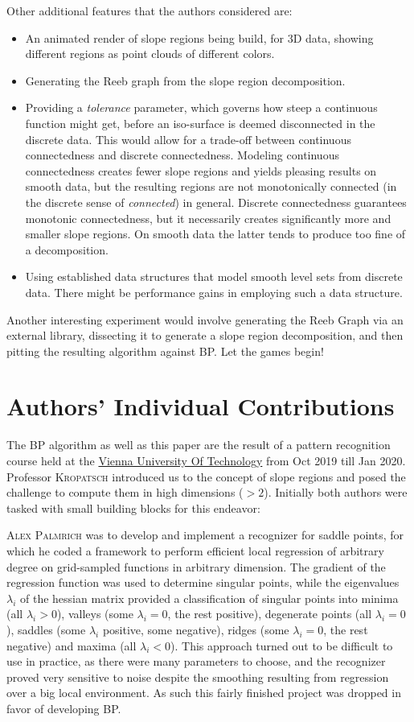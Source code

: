 \documentclass[a4paper,12pt,notitlepage,fullpage]{paper}
\theoremstyle{plain}
\theoremstyle{definition}
\begin{document}
Other additional features that the authors considered are:
\begin{itemize}
\item An animated render of slope regions being build, for 3D data, showing different regions as point clouds of different colors.
\item Generating the Reeb graph from the slope region decomposition.
\item Providing a \emph{tolerance} parameter, which governs how steep a continuous function might get, before an iso-surface is deemed disconnected in the discrete data.
This would allow for a trade-off between continuous connectedness and discrete connectedness.
Modeling continuous connectedness creates fewer slope regions and yields pleasing results on smooth data, but the resulting regions are not monotonically connected (in the discrete sense of \emph{connected}) in general.
Discrete connectedness guarantees monotonic connectedness, but it necessarily creates significantly more and smaller slope regions.
On smooth data the latter tends to produce too fine of a decomposition.
\item Using established data structures that model smooth level sets from discrete data. There might be performance gains in employing such a data structure.
\end{itemize}

Another interesting experiment would involve generating the Reeb Graph via an external library, dissecting it to generate a slope region decomposition, and then pitting the resulting algorithm against BP. Let the games begin!

\section{Authors' Individual Contributions}
The BP algorithm as well as this paper are the result of a pattern recognition course held at the \href{https://www.tuwien.at/en/}{Vienna University Of Technology} from Oct 2019 till Jan 2020. Professor \textsc{Kropatsch} introduced us to the concept of slope regions and posed the challenge to compute them in high dimensions ($>2$). Initially both authors were tasked with small building blocks for this endeavor:

\textsc{Alex Palmrich} was to develop and implement a recognizer for saddle points, for which he coded a framework to perform efficient local regression of arbitrary degree on grid-sampled functions in arbitrary dimension. The gradient of the regression function was used to determine singular points, while the eigenvalues $\lambda_i$ of the hessian matrix provided a classification of singular points into minima (all $\lambda_i>0$), valleys (some $\lambda_i=0$, the rest positive), degenerate points (all $\lambda_i=0$), saddles (some $\lambda_i$ positive, some negative), ridges (some $\lambda_i=0$, the rest negative) and maxima (all $\lambda_i<0$). This approach turned out to be difficult to use in practice, as there were many parameters to choose, and the recognizer proved very sensitive to noise despite the smoothing resulting from regression over a big local environment. As such this fairly finished project was dropped in favor of developing BP.
\end{document}
